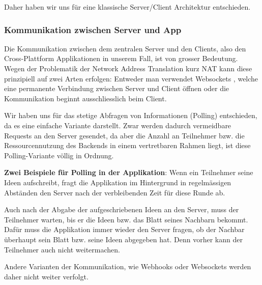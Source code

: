 Daher haben wir uns für eine klassische Server/Client Architektur entschieden.

\subsubsection{Kommunikation zwischen Server und App}
Die Kommunikation zwischen dem zentralen Server und den Clients, also den Cross-Plattform Applikationen in unserem Fall, ist von grosser Bedeutung. Wegen der Problematik der Network Address Translation kurz NAT \cite{NAT} kann diese prinzipiell auf zwei Arten erfolgen: Entweder man verwendet Websockets \cite{WebSockets}, welche eine permanente Verbindung zwischen Server und Client öffnen oder die Kommunikation beginnt ausschliesslich beim Client. 


Wir haben uns für das stetige Abfragen von Informationen (Polling) entschieden, da es eine einfache Variante darstellt. Zwar werden dadurch vermeidbare Requests an den Server gesendet, da aber die Anzahl an Teilnehmer bzw. die Ressourcennutzung des Backends in einem vertretbaren Rahmen liegt, ist diese Polling-Variante völlig in Ordnung.  

\textbf{Zwei Beispiele für Polling in der Applikation}: Wenn ein Teilnehmer seine Ideen aufschreibt, fragt die Applikation im Hintergrund in regelmässigen Abständen den Server nach der verbleibenden Zeit für diese Runde ab.


Auch nach der Abgabe der aufgeschriebenen Ideen an den Server, muss der Teilnehmer warten, bis er die Ideen bzw. das Blatt seines Nachbarn bekommt. Dafür muss die Applikation immer wieder den Server fragen, ob der Nachbar überhaupt sein Blatt bzw. seine Ideen abgegeben hat. Denn vorher kann der Teilnehmer auch nicht weitermachen.


Andere Varianten der Kommunikation, wie Webhooks oder Websockets werden daher nicht weiter verfolgt.
